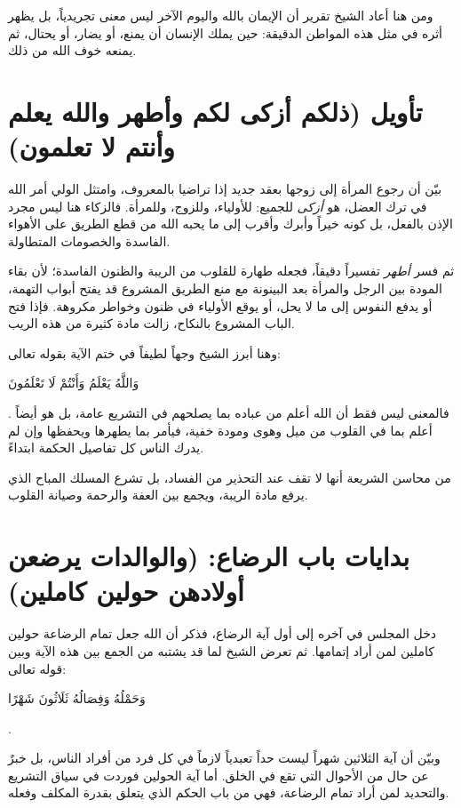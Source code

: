 ومن هنا أعاد الشيخ تقرير أن الإيمان بالله واليوم الآخر ليس معنى تجريدياً، بل يظهر أثره في مثل هذه المواطن الدقيقة: حين يملك الإنسان أن يمنع، أو يضار، أو يحتال، ثم يمنعه خوف الله من ذلك.

\section{تأويل (ذلكم أزكى لكم وأطهر والله يعلم وأنتم لا تعلمون)}
بيّن  أن رجوع المرأة إلى زوجها بعقد جديد إذا تراضيا بالمعروف، وامتثل الولي أمر الله في ترك العضل، هو \textit{أزكى} للجميع: للأولياء، وللزوج، وللمرأة. فالزكاء هنا ليس مجرد الإذن بالفعل، بل كونه خيراً وأبرك وأقرب إلى ما يحبه الله من قطع الطريق على الأهواء الفاسدة والخصومات المتطاولة.

ثم فسر \textit{أطهر} تفسيراً دقيقاً، فجعله طهارة للقلوب من الريبة والظنون الفاسدة؛ لأن بقاء المودة بين الرجل والمرأة بعد البينونة مع منع الطريق المشروع قد يفتح أبواب التهمة، أو يدفع النفوس إلى ما لا يحل، أو يوقع الأولياء في ظنون وخواطر مكروهة. فإذا فتح الباب المشروع بالنكاح، زالت مادة كثيرة من هذه الريب.

وهنا أبرز الشيخ وجهاً لطيفاً في ختم الآية بقوله تعالى: \begin{ayah}وَاللَّهُ يَعْلَمُ وَأَنْتُمْ لَا تَعْلَمُونَ\end{ayah}. فالمعنى ليس فقط أن الله أعلم من عباده بما يصلحهم في التشريع عامة، بل هو أيضاً أعلم بما في القلوب من ميل وهوى ومودة خفية، فيأمر بما يطهرها ويحفظها وإن لم يدرك الناس كل تفاصيل الحكمة ابتداءً.

\begin{fawaid}
من محاسن الشريعة أنها لا تقف عند التحذير من الفساد، بل تشرع المسلك المباح الذي يرفع مادة الريبة، ويجمع بين العفة والرحمة وصيانة القلوب.
\end{fawaid}

\separator

\section{بدايات باب الرضاع: (والوالدات يرضعن أولادهن حولين كاملين)}
دخل المجلس في آخره إلى أول آية الرضاع، فذكر  أن الله جعل تمام الرضاعة حولين كاملين لمن أراد إتمامها. ثم تعرض الشيخ لما قد يشتبه من الجمع بين هذه الآية وبين قوله تعالى: \begin{ayah}وَحَمْلُهُ وَفِصَالُهُ ثَلَاثُونَ شَهْرًا\end{ayah}.

وبيّن أن آية الثلاثين شهراً ليست حداً تعبدياً لازماً في كل فرد من أفراد الناس، بل خبرٌ عن حال من الأحوال التي تقع في الخلق. أما آية الحولين فوردت في سياق التشريع والتحديد لمن أراد تمام الرضاعة، فهي من باب الحكم الذي يتعلق بقدرة المكلف وفعله.


